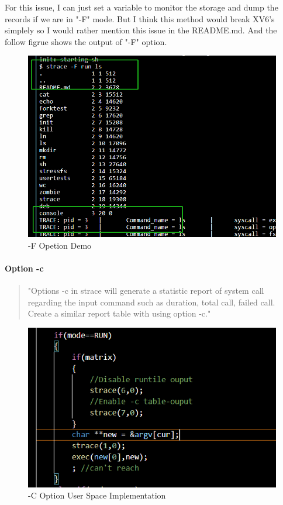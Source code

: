 \documentclass[11pt,oneside,a4paper]{article}
\begin{document}
For this issue, I can just set a variable to monitor the storage and dump the records if 
we are in "-F" mode. But I think this method would break XV6's simplely so I would rather 
mention this issue in the README.md. And the follow figrue shows the output of "-F" option.

\begin{figure}[H]
    \includegraphics[width=4.75in]{1-25.png}
    \centering
    \caption{-F Opetion Demo}
\end{figure}

\paragraph*{Option -c}
\begin{quotation}
    "Options -c in strace will generate a statistic report of system call regarding the input command
    such as duration, total call, failed call. Create a similar report table with using option -c."
\end{quotation}

\begin{figure}[H]
    \includegraphics[width=4.75in]{1-37.png}
    \centering
    \caption{-C Option User Space Implementation}
\end{figure}
\end{document}
